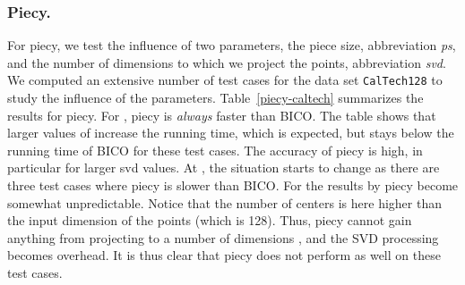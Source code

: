 \documentclass[a4paper]{scrartcl}
\begin{document}
\subsubsection*{Piecy.}
For piecy, we test the influence of two parameters, the piece size, abbreviation \emph{ps}, and the number of dimensions to which we project the points, abbreviation \emph{svd}. We computed an extensive number of test cases for the data set \texttt{CalTech128} to study the influence of the parameters. Table~\ref{piecy-caltech} summarizes the results for piecy. For , piecy is \emph{always} faster than BICO. The table shows that larger values of  increase the running time, which is expected, but stays below the running time of BICO for these test cases. The accuracy of piecy is high, in particular for larger svd values. At , the situation starts to change as there are three test cases where piecy is slower than BICO. For  the results by piecy become somewhat unpredictable. Notice that the number of centers is here higher than the input dimension of the points (which is 128). Thus, piecy cannot gain anything from projecting to a number of dimensions , and the SVD processing becomes overhead. It is thus clear that piecy does not perform as well on these test cases.
\end{document}
